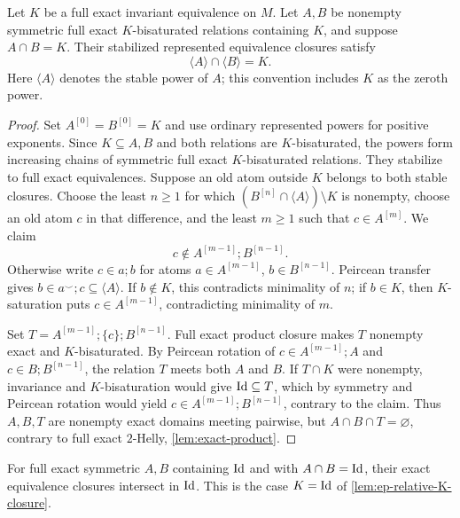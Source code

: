 \begin{lemma}
\label{lem:ep-relative-K-closure}
Let $K$ be a full exact invariant equivalence on $M$. Let
$A,B$ be nonempty symmetric full exact $K$-bisaturated relations
containing $K$, and suppose $A\cap B=K$. Their stabilized
represented equivalence closures satisfy
\[
 \boxed{\langle A\rangle\cap\langle B\rangle=K.}
 \tag{S2}\label{eq:ep-relative-K-closure}
\]
Here $\langle A\rangle$ denotes the stable power of $A$;
this convention includes $K$ as the zeroth power.
\end{lemma}
\begin{proof}
Set $A^{[0]}=B^{[0]}=K$ and use ordinary represented powers
for positive exponents. Since $K\subseteq A,B$ and both relations
are $K$-bisaturated, the powers form increasing chains of
symmetric full exact $K$-bisaturated relations. They stabilize
to full exact equivalences. Suppose an old atom outside $K$
belongs to both stable closures. Choose the least $n\ge1$ for
which $(B^{[n]}\cap\langle A\rangle)\setminus K$ is nonempty,
choose an old atom $c$ in that difference, and the least
$m\ge1$ such that $c\in A^{[m]}$.
We claim
\[
 c\notin A^{[m-1]};B^{[n-1]}.
 \tag{S3}\label{eq:ep-minimal-c}
\]
Otherwise write $c\in a;b$ for atoms
$a\in A^{[m-1]}$, $b\in B^{[n-1]}$. Peircean transfer gives
$b\in a^\smile;c\subseteq\langle A\rangle$. If $b\notin K$,
this contradicts minimality of $n$; if $b\in K$, then
$K$-saturation puts $c\in A^{[m-1]}$, contradicting
minimality of $m$.

Set $T=A^{[m-1]};\{c\};B^{[n-1]}$. Full exact product
closure makes $T$ nonempty exact and $K$-bisaturated. By
Peircean rotation of $c\in A^{[m-1]};A$ and
$c\in B;B^{[n-1]}$, the relation $T$ meets both $A$ and $B$.
If $T\cap K$ were nonempty, invariance and $K$-bisaturation
would give $\mathrm{Id}\subseteq T$, which by symmetry and
Peircean rotation would yield
$c\in A^{[m-1]};B^{[n-1]}$, contrary to the claim.
Thus $A,B,T$ are nonempty exact domains meeting pairwise,
but $A\cap B\cap T=\varnothing$, contrary to full exact
$2$-Helly, \cref{lem:exact-product}.
\end{proof}

\begin{corollary}
\label{cor:foundations-identity-separation}
For full exact symmetric $A,B$ containing $\mathrm{Id}$ and with
$A\cap B=\mathrm{Id}$, their exact equivalence closures intersect in
$\mathrm{Id}$. This is the case $K=\mathrm{Id}$ of
\cref{lem:ep-relative-K-closure}.
\end{corollary}

